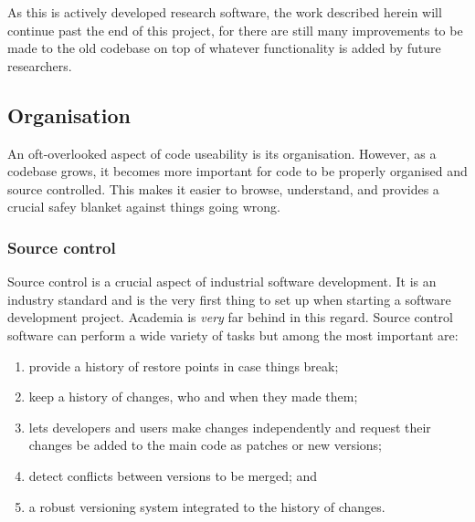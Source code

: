 As this is actively developed research software, the work described herein will continue past the end of this project, for there are still many improvements to be made to the old codebase on top of whatever functionality is added by future researchers.

\subsection{Organisation}

An oft-overlooked aspect of code useability is its organisation. However, as a codebase grows, it becomes more important for code to be properly organised and source controlled. This makes it easier to browse, understand, and provides a crucial safey blanket against things going wrong.

\subsubsection{Source control}

Source control is a crucial aspect of industrial software development. It is an industry standard and is the very first thing to set up when starting a software development project. Academia is \emph{very} far behind in this regard. Source control software can perform a wide variety of tasks but among the most important are:
\begin{enumerate}
    \item provide a history of restore points in case things break;
    \item keep a history of changes, who and when they made them;
    \item lets developers and users make changes independently and request their changes be added to the main code as patches or new versions;
    \item detect conflicts between versions to be merged; and
    \item a robust versioning system integrated to the history of changes.
\end{enumerate}


